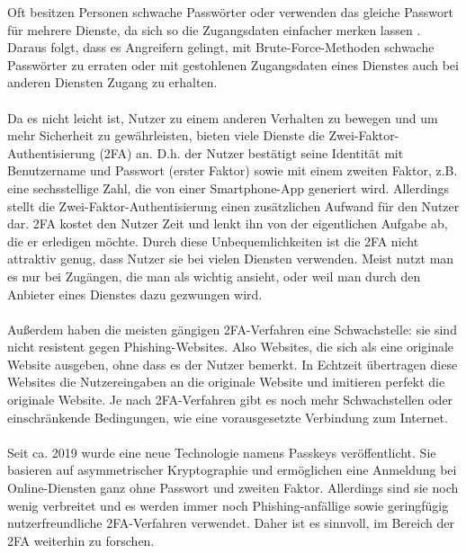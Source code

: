 Oft besitzen Personen schwache Passwörter oder verwenden das gleiche 
Passwort für mehrere Dienste, da sich so die Zugangsdaten einfacher merken 
lassen \autocite{PwReuse}. Daraus folgt, dass es Angreifern gelingt, mit 
Brute-Force-Methoden schwache Passwörter zu erraten oder mit gestohlenen 
Zugangsdaten eines Dienstes auch bei anderen Diensten Zugang zu erhalten.
\\\\
Da es nicht leicht ist, Nutzer zu einem anderen Verhalten zu bewegen und um 
mehr Sicherheit zu gewährleisten, bieten viele Dienste die 
Zwei-Faktor-Authentisierung (2FA) an. D.h. der Nutzer bestätigt seine 
Identität mit Benutzername und Passwort (erster Faktor) sowie mit einem 
zweiten Faktor, z.B. eine sechsstellige Zahl, die von einer Smartphone-App 
generiert wird. Allerdings stellt die Zwei-Faktor-Authentisierung einen 
zusätzlichen Aufwand für den Nutzer dar. 2FA kostet den Nutzer Zeit und 
lenkt ihn von der eigentlichen Aufgabe ab, die er erledigen möchte. Durch 
diese Unbequemlichkeiten ist die 2FA nicht attraktiv genug, dass Nutzer sie 
bei vielen Diensten verwenden. Meist nutzt man es nur bei Zugängen, die man 
als wichtig ansieht, oder weil man durch den Anbieter eines Dienstes dazu 
gezwungen wird.
\\\\
Außerdem haben die meisten gängigen 2FA-Verfahren eine Schwachstelle: sie 
sind nicht resistent gegen Phishing-Websites. Also Websites, die sich als 
eine originale Website ausgeben, ohne dass es der Nutzer bemerkt. In 
Echtzeit übertragen diese Websites die Nutzereingaben an die originale 
Website und imitieren perfekt die originale Website. Je nach 2FA-Verfahren 
gibt es noch mehr Schwachstellen oder einschränkende Bedingungen, wie eine 
vorausgesetzte Verbindung zum Internet.
\\\\
Seit ca. 2019 wurde eine neue Technologie namens Passkeys veröffentlicht. Sie 
basieren auf asymmetrischer Kryptographie und ermöglichen eine Anmeldung bei 
Online-Diensten ganz ohne Passwort und zweiten Faktor. Allerdings sind sie noch 
wenig verbreitet und es werden immer noch 
Phishing-anfällige sowie geringfügig nutzerfreundliche 2FA-Verfahren verwendet. 
Daher ist es sinnvoll, im Bereich der 2FA weiterhin zu forschen.